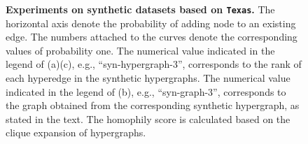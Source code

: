 \documentclass[review]{elsarticle}
\begin{document}
\begin{figure}[htbp]
  \centering
  \caption{\textbf{Experiments on synthetic datasets based on \texttt{Texas}.} The horizontal axis denote the probability of adding node to an existing edge. The numbers attached to the curves denote the corresponding values of probability one. The numerical value indicated in the legend of (a)(c), e.g., ``syn-hypergraph-3'', corresponds to the rank of each hyperedge in the synthetic hypergraphs. The numerical value indicated in the legend of (b), e.g., ``syn-graph-3'', corresponds to the graph obtained from the corresponding synthetic hypergraph, as stated in the text. The homophily score is calculated based on the clique expansion of hypergraphs.}
  \label{fig:q5-5}
\end{figure}
\end{document}
